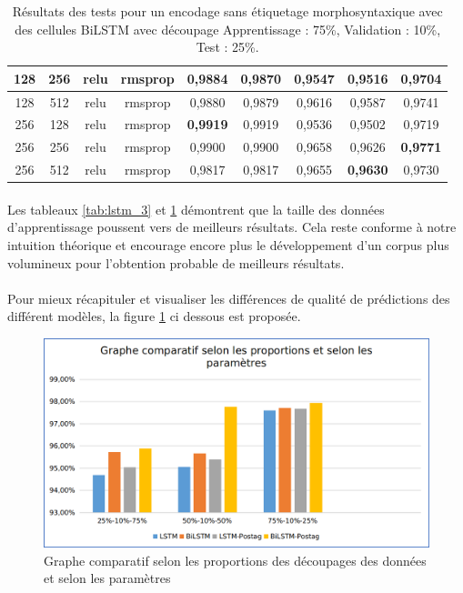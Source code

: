 \begin{table}[H]
{\begin{tabular}{|c|c|c|c|c|c|c|c|c|}
				128 & 256 & relu & rmsprop & 0,9884 & 0,9870 & 0,9547 & 0,9516 & 0,9704 \\ \hline
				128 & 512 & relu & rmsprop & 0,9880 & 0,9879 & 0,9616 & 0,9587 & 0,9741 \\ \hline
				256 & 128 & relu & rmsprop & \textbf{0,9919} & 0,9919 & 0,9536 & 0,9502 & 0,9719 \\ \hline
				\rowcolor[HTML]{96FFFB} 
				256 & 256 & relu & rmsprop & 0,9900 & 0,9900 & 0,9658 & 0,9626 & \textbf{0,9771} \\ \hline
				256 & 512 & relu & rmsprop & 0,9817 & 0,9817 & 0,9655 & \textbf{0,9630} & 0,9730 \\ \hline
			\end{tabular}%
		}
		\caption{Résultats des tests pour un encodage sans étiquetage morphosyntaxique avec des cellules BiLSTM avec découpage Apprentissage : 75\%, Validation : 10\%, Test : 25\%.}
		\label{tab:bilstm_3}
	\end{table}
	\paragraph{}
	Les tableaux \ref{tab:lstm_3} et \ref{tab:bilstm_3} démontrent que la taille des données d'apprentissage poussent vers de meilleurs résultats. Cela reste conforme à notre intuition théorique et encourage encore plus le développement d'un corpus plus volumineux pour l'obtention probable de meilleurs résultats.
	
	\paragraph{}
	Pour mieux récapituler et visualiser les différences de qualité de prédictions des différent modèles, la figure \ref{compare} ci dessous est proposée.
	
	\begin{figure}[H]
		\centering
		\includegraphics[width=.9\linewidth]{images/implementation/graphs.png} 
		\caption{Graphe comparatif selon les proportions des découpages des données et selon les paramètres}
		\label{compare}
	\end{figure}
